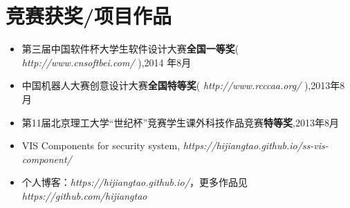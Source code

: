 \documentclass{resume}
\begin{document}
\section{竞赛获奖/项目作品}
\begin{itemize}[parsep=0.2ex]
  \item 第三届中国软件杯大学生软件设计大赛\textbf{全国一等奖}( \textit{http://www.cnsoftbei.com/} ),2014 年8月
  \item 中国机器人大赛创意设计大赛\textbf{全国特等奖}( \textit{http://www.rcccaa.org/} ),2013年8月
  \item 第11届北京理工大学“世纪杯”竞赛学生课外科技作品竞赛\textbf{特等奖},2013年8月
  \item VIS Components for security system, \textit{https://hijiangtao.github.io/ss-vis-component/}
  \item 个人博客：\textit{https://hijiangtao.github.io/}，更多作品见 \textit{https://github.com/hijiangtao}
\end{itemize}



\end{document}
